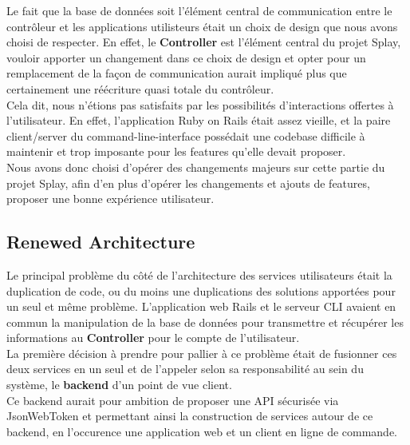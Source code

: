 \documentclass{eplmastersthesis}
\begin{document}
        Le fait que la base de données soit l'élément central de communication entre
        le contrôleur et les applications utilisteurs était un choix de design
        que nous avons choisi de respecter. En effet, le \textbf{Controller} est
        l'élément central du projet Splay, vouloir apporter un changement dans ce choix
        de design et opter pour un remplacement de la façon de communication aurait
        impliqué plus que certainement une réécriture quasi totale du contrôleur.\\

        Cela dit, nous n'étions pas satisfaits par les possibilités d'interactions
        offertes à l'utilisateur. En effet, l'application Ruby on Rails était assez
        vieille, et la paire client/server du command-line-interface possédait une
        codebase difficile à maintenir et trop imposante pour les features qu'elle
        devait proposer.\\

        Nous avons donc choisi d'opérer des changements majeurs sur cette partie
        du projet Splay, afin d'en plus d'opérer les changements et ajouts de features,
        proposer une bonne expérience utilisateur.

      \subsection{Renewed Architecture}

        Le principal problème du côté de l'architecture des services utilisateurs
        était la duplication de code, ou du moins une duplications des solutions
        apportées pour un seul et même problème. L'application web Rails et le
        serveur CLI avaient en commun la manipulation de la base de données pour
        transmettre et récupérer les informations au \textbf{Controller} pour
        le compte de l'utilisateur.\\

        La première décision à prendre pour pallier à ce problème était de
        fusionner ces deux services en un seul et de l'appeler selon sa responsabilité
        au sein du système, le \textbf{backend} d'un point de vue client.\\
        Ce backend aurait pour ambition de proposer une API sécurisée via
        JsonWebToken et permettant ainsi la construction de services autour de
        ce backend, en l'occurence une application web et un client en ligne
        de commande.\\
\end{document}

